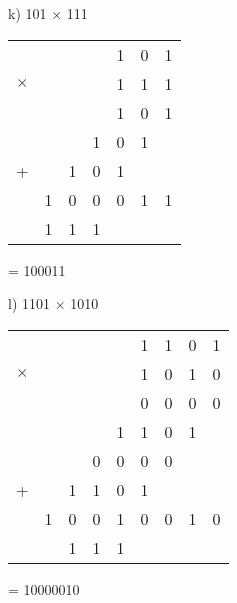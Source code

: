 \begin{figure}[H]
    \begin{minipage}[t]{0.45\textwidth}
        k) 101 $\times$ 111
        \begin{table}[H]
            \centering
            \begin{tabularx}{0.6\linewidth}{rXXXXXX}
                &  &  &  & 1 & 0 & 1\\
                $\times$ &  &  &  &1 & 1 & 1 \\
                \cline{5-7}
                &  &  &  & 1 & 0 & 1\\
                &  &  & 1 & 0 & 1 &  \\
                +&  & 1 & 0 & 1 &  &  \\
                \cline{2-7}
                & 1 & 0 & 0 & 0 & 1 & 1\\
                \cline{2-7}
                & 1 & 1 & 1 &  &  & \\
            \end{tabularx}
        \end{table}
        = 100011
    \end{minipage}\hfill
    \begin{minipage}[t]{0.45\textwidth}
        l) 1101 $\times$ 1010
        \begin{table}[H]
            \centering
            \begin{tabularx}{0.8\linewidth}{rXXXXXXXX}
                &  &  &  & & 1 & 1 & 0 & 1\\
                $\times$ &  &  &  & & 1 & 0 & 1 &0 \\
                \cline{6-9}
                &  &  &  &  & 0 & 0 & 0 & 0 \\
                &  &  &  & 1 & 1 & 0 & 1 & \\
                &  &  & 0 & 0 & 0 & 0 &  & \\
                + &  & 1 & 1 & 0 & 1 &  &  & \\
                \cline{2-9}
                & 1 & 0 & 0 & 1 & 0 & 0 & 1 &0 \\
                \cline{2-9}
                &  & 1 & 1 & 1 &  &  &  & \\
            \end{tabularx}
        \end{table} 
        = 10000010
    \end{minipage}\hfill
\end{figure}

